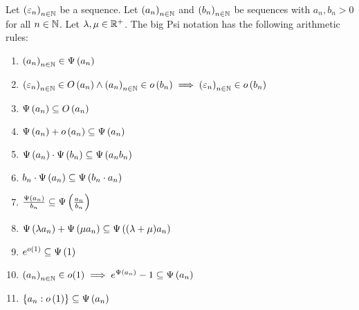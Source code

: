 \begin{theorem} \label{thm:bigpsi:rules}
  Let $\seq{\epsilon_n}$ be a sequence. Let $\seq{a_n}$ and $\seq{b_n}$ be sequences with $a_n,b_n > 0$ for all $n\in\N$. Let $\lambda, \mu \in \Rplus$. The big Psi notation has the following arithmetic rules:

  \begin{enumerate}
    \item $\seq{a_n} \in \bigpsi{a_n}$
    \item $\seq{\epsilon_n} \in \bigo{a_n} \land \seq{a_n} \in \littleo{b_n} \implies \seq{\epsilon_n} \in \littleo{b_n}$
    \item $\bigpsi{a_n} \subseteq \bigo{a_n}$
    \item $\bigpsi{a_n} + \littleo{a_n} \subseteq \bigpsi{a_n}$
    \item $\bigpsi{a_n}\cdot \bigpsi{b_n} \subseteq \bigpsi{a_n b_n}$
    \item $b_n \cdot \bigpsi{a_n} \subseteq \bigpsi{b_n \cdot a_n}$
    \item $\frac{\bigpsi{a_n}}{b_n} \subseteq \bigpsi{\frac{a_n}{b_n}}$
    \item $\bigpsi{\lambda a_n} + \bigpsi{\mu a_n} \subseteq \bigpsi{(\lambda+\mu)a_n}$
    \item $e^{\littleo{1}} \subseteq \bigpsi{1}$
    \item $\seq{a_n} \in o(1) \implies e^{\bigpsi{a_n}}-1 \subseteq \bigpsi{a_n}$
    \item $\ean[\littleo{1}]{a_n} \subseteq \bigpsi{a_n}$
  \end{enumerate}
\end{theorem}
